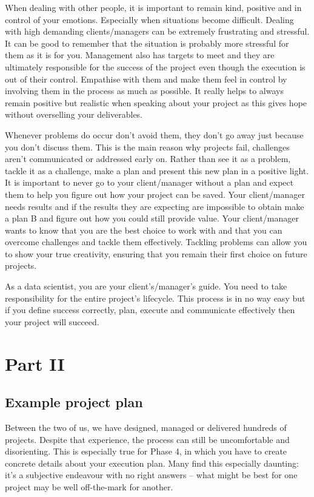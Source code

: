 \documentclass[
]{book}
\begin{document}
When dealing with other people, it is important to remain kind, positive and in control of your emotions. Especially when situations become difficult. Dealing with high demanding clients/managers can be extremely frustrating and stressful. It can be good to remember that the situation is probably more stressful for them as it is for you. Management also has targets to meet and they are ultimately responsible for the success of the project even though the execution is out of their control. Empathise with them and make them feel in control by involving them in the process as much as possible. It really helps to always remain positive but realistic when speaking about your project as this gives hope without overselling your deliverables.

Whenever problems do occur don't avoid them, they don't go away just because you don't discuss them. This is the main reason why projects fail, challenges aren't communicated or addressed early on. Rather than see it as a problem, tackle it as a challenge, make a plan and present this new plan in a positive light. It is important to never go to your client/manager without a plan and expect them to help you figure out how your project can be saved. Your client/manager needs results and if the results they are expecting are impossible to obtain make a plan B and figure out how you could still provide value. Your client/manager wants to know that you are the best choice to work with and that you can overcome challenges and tackle them effectively. Tackling problems can allow you to show your true creativity, ensuring that you remain their first choice on future projects.

As a data scientist, you are your client's/manager's guide. You need to take responsibility for the entire project's lifecycle. This process is in no way easy but if you define success correctly, plan, execute and communicate effectively then your project will succeed.

\hypertarget{part-part-ii}{%
\part*{Part II}\label{part-part-ii}}

\hypertarget{example}{%
\chapter{Example project plan}\label{example}}

Between the two of us, we have designed, managed or delivered hundreds of projects. Despite that experience, the process can still be uncomfortable and disorienting. This is especially true for Phase 4, in which you have to create concrete details about your execution plan. Many find this especially daunting: it's a subjective endeavour with no right answers -- what might be best for one project may be well off-the-mark for another.
\end{document}
